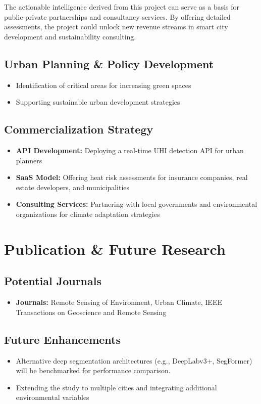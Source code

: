 \documentclass{article}
\begin{document}
The actionable intelligence derived from this project can serve as a basis for public-private partnerships and consultancy services. By offering detailed assessments, the project could unlock new revenue streams in smart city development and sustainability consulting.

\subsection{Urban Planning \& Policy Development}
\begin{itemize}
    \item Identification of critical areas for increasing green spaces
    \item Supporting sustainable urban development strategies
\end{itemize}

\subsection{Commercialization Strategy}
\begin{itemize}
    \item \textbf{API Development:} Deploying a real-time UHI detection API for urban planners
    \item \textbf{SaaS Model:} Offering heat risk assessments for insurance companies, real estate developers, and municipalities
    \item \textbf{Consulting Services:} Partnering with local governments and environmental organizations for climate adaptation strategies
\end{itemize}

\section{Publication \& Future Research}
\subsection{Potential Journals}
\begin{itemize}
    \item \textbf{Journals:} Remote Sensing of Environment, Urban Climate, IEEE Transactions on Geoscience and Remote Sensing
\end{itemize}

\subsection{Future Enhancements}
\begin{itemize}
    \item Alternative deep segmentation architectures (e.g., DeepLabv3+, SegFormer) will be benchmarked for performance comparison.
    \item Extending the study to multiple cities and integrating additional environmental variables
\end{itemize}
\end{document}
